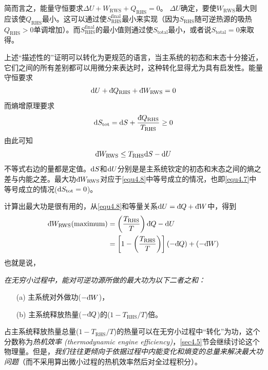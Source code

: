 简而言之，能量守恒要求$\Delta U + W_{\text{RWS}} + Q_{\text{RHS}} = 0$。 $\Delta U$确定，要使$W_{\text{RWS}}$最大则应该使$Q_{\text{RHS}}$最小。这可以通过使$S^{\text{final}}_{\text{RHS}}$最小来实现（因为$S_{\text{RHS}}$随可逆热源的吸热$Q_{\text{RHS}} > 0$单调增加）。而$S^{\text{final}}_{\text{RHS}}$的最小值则通过使$S_{\text{total}}$最小，或者说$S_{\text{total}} = 0$来取得。

上述“描述性的”证明可以转化为更规范的语言，当主系统的初态和末态十分接近，它们之间的所有差别都可以用微分来表达时，这种转化显得尤为具有启发性。能量守恒要求
\begin{equation}
\label{equ4.6}
\mathrm{d} U + \mathrm d\hspace*{-0.1em}\bar{}\hspace*{0.08em} Q_{\text{RHS}} + \mathrm d\hspace*{-0.1em}\bar{}\hspace*{0.08em} W_{\text{RWS}} = 0
\end{equation}
而熵增原理要求
\begin{equation}
\label{equ4.7}
\mathrm{d} S_{\text{tot}} = \mathrm{d} S + \frac{\mathrm d\hspace*{-0.1em}\bar{}\hspace*{0.08em} Q_{\text{RHS}}}{T_{\text{RHS}} } \ge 0
\end{equation}
由此可知
\begin{equation}
\label{equ4.8}
\mathrm d\hspace*{-0.1em}\bar{}\hspace*{0.08em} W_{\text{RWS}} \le T_{\text{RHS}} \mathrm{d} S - \mathrm{d} U 
\end{equation}
不等式右边的量都是定值。$\mathrm{d} S$和$\mathrm{d} U$分别是是主系统钦定的初态和末态之间的熵之差与内能之差。最大功$\mathrm d\hspace*{-0.1em}\bar{}\hspace*{0.08em} W_{\text{RWS}}$对应于\eqref{equ4.8}中等号成立的情况，也即\eqref{equ4.7}中等号成立的情况($\mathrm{d} S_{\text{tot}} = 0$)。

计算出最大功是很有用的，从\eqref{equ4.8}和等量关系$\mathrm{d} U = \mathrm d\hspace*{-0.1em}\bar{}\hspace*{0.08em} Q + \mathrm d\hspace*{-0.1em}\bar{}\hspace*{0.08em} W$中，得到
\begin{equation}
\label{equ4.9}
\begin{split}
\mathrm d\hspace*{-0.1em}\bar{}\hspace*{0.08em} W_{\text{RWS}} (\text{maximum}) &= \left( \frac{T_{\text{RHS}}}{T} \right) \mathrm d\hspace*{-0.1em}\bar{}\hspace*{0.08em} Q - \mathrm{d} U \\
&= \left[ 1 - \left( \frac{T_{\text{RHS}}}{T} \right) \right] (-\mathrm d\hspace*{-0.1em}\bar{}\hspace*{0.08em} Q) + (-\mathrm d\hspace*{-0.1em}\bar{}\hspace*{0.08em} W)
\end{split}
\end{equation} 
也就是说，{\it 在无穷小过程中，能对可逆功源所做的最大功为以下二者之和：

\begin{enumerate}
\item[(a)] 主系统对外做功($-\mathrm d\hspace*{-0.1em}\bar{}\hspace*{0.08em} W$)，  
\item[(b)] 主系统释放热量($-\mathrm d\hspace*{-0.1em}\bar{}\hspace*{0.08em} Q$)的($1 - T_{\text{RHS}}/T$)倍。
\end{enumerate}}
占主系统释放热量总量($1 - T_{\text{RHS}}/T$)的热量可以在无穷小过程中“转化”为功，这个分数称为{\it 热机效率 (thermodynamic engine efficiency)}，\ref{sec4.5}节会继续讨论这个物理量。但是，{\it 我们往往更倾向于依据过程中内能变化和熵变的总量来解决最大功问题}（而不采用算出微小过程的热机效率然后对全过程积分）。

